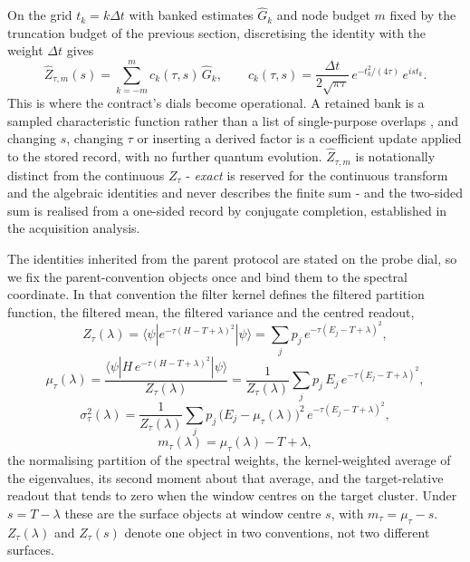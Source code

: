 On the grid $t_k=k\Delta t$ with banked estimates $\widehat G_k$ and node budget $m$ fixed by the truncation budget of the previous section, discretising the identity with the weight $\Delta t$ gives
\begin{equation}\label{def:coefficient-update}
\widehat Z_{\tau,m}(s)=\sum_{k=-m}^{m}c_k(\tau,s)\,\widehat G_k,\qquad c_k(\tau,s)=\frac{\Delta t}{2\sqrt{\pi\tau}}\,e^{-t_k^{2}/(4\tau)}\,e^{ist_k}.
\end{equation}
This is where the contract's dials become operational. A retained bank is a sampled characteristic function rather than a list of single-purpose overlaps \cite{somma2019eigenvalue,obrien2019qpe}, and changing $s$, changing $\tau$ or inserting a derived factor is a coefficient update applied to the stored record, with no further quantum evolution. $\widehat Z_{\tau,m}$ is notationally distinct from the continuous $Z_\tau$ - \emph{exact} is reserved for the continuous transform and the algebraic identities and never describes the finite sum - and the two-sided sum is realised from a one-sided record by conjugate completion, established in the acquisition analysis.

The identities inherited from the parent protocol are stated on the probe dial, so we fix the parent-convention objects once and bind them to the spectral coordinate. In that convention the filter kernel defines the filtered partition function, the filtered mean, the filtered variance and the centred readout,
\begin{equation}\label{def:filtered-partition}
Z_\tau(\lambda)=\langle\psi|e^{-\tau(H-T+\lambda)^{2}}|\psi\rangle=\sum_j p_j\,e^{-\tau(E_j-T+\lambda)^{2}},
\end{equation}
\begin{equation}\label{def:filtered-mean}
\mu_\tau(\lambda)=\frac{\langle\psi|H\,e^{-\tau(H-T+\lambda)^{2}}|\psi\rangle}{Z_\tau(\lambda)}=\frac{1}{Z_\tau(\lambda)}\sum_j p_j\,E_j\,e^{-\tau(E_j-T+\lambda)^{2}},
\end{equation}
\begin{equation}\label{def:filtered-variance}
\sigma_\tau^{2}(\lambda)=\frac{1}{Z_\tau(\lambda)}\sum_j p_j\,\bigl(E_j-\mu_\tau(\lambda)\bigr)^{2}\,e^{-\tau(E_j-T+\lambda)^{2}},
\end{equation}
\begin{equation}\label{def:centered-readout}
m_\tau(\lambda)=\mu_\tau(\lambda)-T+\lambda,
\end{equation}
the normalising partition of the spectral weights, the kernel-weighted average of the eigenvalues, its second moment about that average, and the target-relative readout that tends to zero when the window centres on the target cluster. Under $s=T-\lambda$ these are the surface objects at window centre $s$, with $m_\tau=\mu_\tau-s$. $Z_\tau(\lambda)$ and $Z_\tau(s)$ denote one object in two conventions, not two different surfaces.

